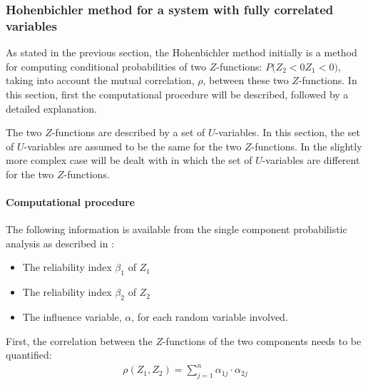 
\subsubsection{Hohenbichler method for a system with fully correlated variables}\label{Section_2.4.2.2}

As stated in the previous section, the Hohenbichler method initially is a method for computing conditional probabilities of two $Z$-functions: $P(Z_2<0$\textbar $Z_1<0)$, taking into account the mutual correlation, $\rho$, between these two $Z$-functions. In this section, first the computational procedure will be described, followed by a detailed explanation.

The two $Z$-functions are described by a set of $U$-variables. In this section, the set of $U$-variables are assumed to be the same for the two $Z$-functions. In  the slightly more complex case will be dealt with in which the set of $U$-variables are different for the two $Z$-functions.

\paragraph*{Computational procedure}

The following information is available from the single component probabilistic analysis as described in :
\begin{itemize}
\item The reliability index $\beta_1$ of $Z_1$

\item The reliability index $\beta_2$ of $Z_2$

\item The influence variable, $\alpha $, for each random variable involved. 
\end{itemize}
First, the correlation between the $Z$-functions of the two components needs to be quantified:
\begin{align}
\rho \left(Z_{1} ,Z_{2} \right)=\sum _{j=1}^{n}\alpha _{1j} \cdot \alpha _{2j}  \label{eq:2-73} 
\end{align}

